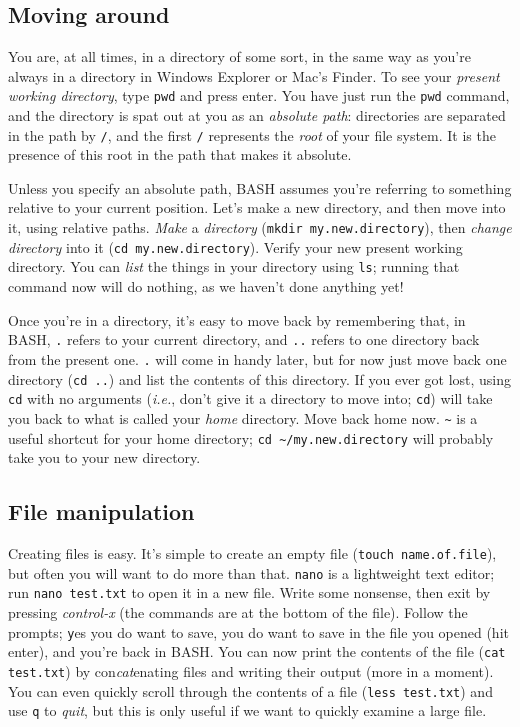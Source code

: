\documentclass[12pt]{report}
\begin{document}
\subsection{Moving around}
You are, at all times, in a directory of some sort, in the same way as
you're always in a directory in Windows Explorer or Mac's Finder. To
see your \emph{present working directory}, type \texttt{pwd} and press
enter. You have just run the \texttt{pwd} command, and the directory
is spat out at you as an \emph{absolute path}: directories are
separated in the path by \texttt{/}, and the first \texttt{/}
represents the \emph{root} of your file system. It is the presence of
this root in the path that makes it absolute.

Unless you specify an absolute path, BASH assumes you're referring to
something relative to your current position. Let's make a new
directory, and then move into it, using relative paths. \emph{Make} a
\emph{directory} (\texttt{mkdir my.new.directory}), then \emph{change
  directory} into it (\texttt{cd my.new.directory}). Verify your new
present working directory. You can \emph{list} the things in your
directory using \texttt{ls}; running that command now will do nothing,
as we haven't done anything yet!

Once you're in a directory, it's easy to move back by remembering
that, in BASH, \texttt{.} refers to your current directory, and
\texttt{..} refers to one directory back from the present
one. \texttt{.} will come in handy later, but for now just move back
one directory (\texttt{cd ..}) and list the contents of this
directory. If you ever got lost, using \texttt{cd} with no arguments
(\emph{i.e.}, don't give it a directory to move into; \texttt{cd})
will take you back to what is called your \emph{home} directory. Move
back home now. \texttt{\textasciitilde} is a useful shortcut for your home
directory; \texttt{cd \textasciitilde/my.new.directory} will probably take you to
your new directory.
\subsection{File manipulation}
Creating files is easy. It's simple to create an empty file
(\texttt{touch name.of.file}), but often you will want to do more than
that. \texttt{nano} is a lightweight text editor; run \texttt{nano
  test.txt} to open it in a new file. Write some nonsense, then exit
by pressing \emph{control-x} (the commands are at the bottom of the
file). Follow the prompts; \texttt{y}es you do want to save, you do
want to save in the file you opened (hit enter), and you're back in
BASH. You can now print the contents of the file (\texttt{cat
  test.txt}) by con\emph{cat}enating files and writing their output
(more in a moment). You can even quickly scroll through the contents
of a file (\texttt{less test.txt}) and use \texttt{q} to \emph{quit},
but this is only useful if we want to quickly examine a large file.
\end{document}

